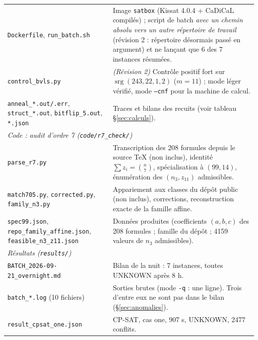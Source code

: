 \documentclass[11pt,a4paper]{article}
\theoremstyle{definition}
\theoremstyle{remark}
\newcommand{\srg}{\operatorname{srg}}
\newcommand{\code}[1]{\texttt{#1}}
\begin{document}
\begin{longtable}{p{5.2cm}p{9.6cm}}
\code{Dockerfile}, \code{run\_batch.sh} & Image \code{satbox} (Kissat 4.0.4 + CaDiCaL compilés) ; script de batch \emph{avec un chemin absolu vers un autre répertoire de travail} (révision 2 : répertoire désormais passé en argument) et ne lançant que 6 des 7 instances résumées.\\
\code{control\_bvls.py} & \emph{(Révision 2)} Contrôle positif fort sur $\srg(243,22,1,2)$ ($m=11$) ; mode léger vérifié, mode \code{--cnf} pour la machine de calcul.\\
\code{anneal\_*.out/.err}, \code{struct\_*.out}, \code{bitflip\_5.out}, \code{*.json} & Traces et bilans des recuits (voir tableau §\ref{sec:calculs}).\\
\multicolumn{2}{l}{\emph{Code : audit d'ordre 7 (\code{code/r7\_check/})}}\\
\code{parse\_r7.py} & Transcription des 208 formules depuis le source \TeX{} (non inclus), identité $\sum z_i=\binom n7$, spécialisation à $(99,14)$, énumération des $(n_3,z_{11})$ admissibles.\\
\code{match705.py}, \code{corrected.py}, \code{family\_n3.py} & Appariement aux classes du dépôt public (non inclus), corrections, reconstruction exacte de la famille affine.\\
\code{spec99.json}, \code{repo\_family\_affine.json}, \code{feasible\_n3\_z11.json} & Données produites (coefficients $(a,b,c)$ des 208 formules ; famille du dépôt ; 4159 valeurs de $n_3$ admissibles).\\
\multicolumn{2}{l}{\emph{Résultats (\code{results/})}}\\
\code{BATCH\_2026-09-21\_overnight.md} & Bilan de la nuit : 7 instances, toutes UNKNOWN après 8 h.\\
\code{batch\_*.log} (10 fichiers) & Sorties brutes (mode \code{-q} : une ligne). Trois d'entre eux ne sont pas dans le bilan (§\ref{sec:anomalies}).\\
\code{result\_cpsat\_one.json} & CP-SAT, cas one, 907 s, UNKNOWN, 2477 conflits.\\
\bottomrule
\end{longtable}
\end{document}
